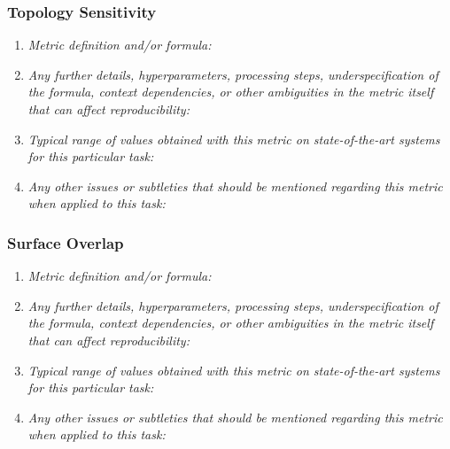 \documentclass[a4paper,11pt]{article}
\begin{document}
        \subsubsection{Topology Sensitivity}
            \begin{enumerate}[label=\alph*.]
                \item \textit{Metric definition and/or formula:}
                \bigskip
                \item \textit{Any further details, hyperparameters, processing steps, underspecification of the formula, context dependencies, or other ambiguities in the metric itself that can affect reproducibility:}
                \bigskip
                \item \textit{Typical range of values obtained with this metric on state-of-the-art systems for this particular task:}
                \bigskip
                \item \textit{Any other issues or subtleties that should be mentioned regarding this metric when applied to this task:}
                \bigskip
            \end{enumerate}
        \subsubsection{Surface Overlap}
            \begin{enumerate}[label=\alph*.]
                \item \textit{Metric definition and/or formula:}
                \bigskip
                \item \textit{Any further details, hyperparameters, processing steps, underspecification of the formula, context dependencies, or other ambiguities in the metric itself that can affect reproducibility:}
                \bigskip
                \item \textit{Typical range of values obtained with this metric on state-of-the-art systems for this particular task:}
                \bigskip
                \item \textit{Any other issues or subtleties that should be mentioned regarding this metric when applied to this task:}
                \bigskip
            \end{enumerate}
\end{document}

